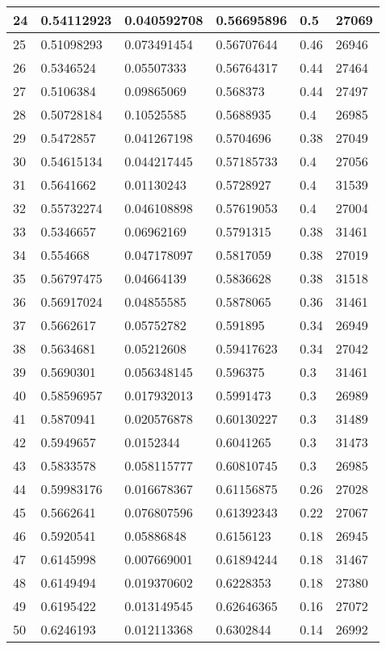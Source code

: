 \begin{longtable}{|l|l|l|l|l|l|}
24 & 0.54112923 & 0.040592708 & 0.56695896 & 0.5 & 27069 \\ \hline 
25 & 0.51098293 & 0.073491454 & 0.56707644 & 0.46 & 26946 \\ \hline 
26 & 0.5346524 & 0.05507333 & 0.56764317 & 0.44 & 27464 \\ \hline 
27 & 0.5106384 & 0.09865069 & 0.568373 & 0.44 & 27497 \\ \hline 
28 & 0.50728184 & 0.10525585 & 0.5688935 & 0.4 & 26985 \\ \hline 
29 & 0.5472857 & 0.041267198 & 0.5704696 & 0.38 & 27049 \\ \hline 
30 & 0.54615134 & 0.044217445 & 0.57185733 & 0.4 & 27056 \\ \hline 
31 & 0.5641662 & 0.01130243 & 0.5728927 & 0.4 & 31539 \\ \hline 
32 & 0.55732274 & 0.046108898 & 0.57619053 & 0.4 & 27004 \\ \hline 
33 & 0.5346657 & 0.06962169 & 0.5791315 & 0.38 & 31461 \\ \hline 
34 & 0.554668 & 0.047178097 & 0.5817059 & 0.38 & 27019 \\ \hline 
35 & 0.56797475 & 0.04664139 & 0.5836628 & 0.38 & 31518 \\ \hline 
36 & 0.56917024 & 0.04855585 & 0.5878065 & 0.36 & 31461 \\ \hline 
37 & 0.5662617 & 0.05752782 & 0.591895 & 0.34 & 26949 \\ \hline 
38 & 0.5634681 & 0.05212608 & 0.59417623 & 0.34 & 27042 \\ \hline 
39 & 0.5690301 & 0.056348145 & 0.596375 & 0.3 & 31461 \\ \hline 
40 & 0.58596957 & 0.017932013 & 0.5991473 & 0.3 & 26989 \\ \hline 
41 & 0.5870941 & 0.020576878 & 0.60130227 & 0.3 & 31489 \\ \hline 
42 & 0.5949657 & 0.0152344 & 0.6041265 & 0.3 & 31473 \\ \hline 
43 & 0.5833578 & 0.058115777 & 0.60810745 & 0.3 & 26985 \\ \hline 
44 & 0.59983176 & 0.016678367 & 0.61156875 & 0.26 & 27028 \\ \hline 
45 & 0.5662641 & 0.076807596 & 0.61392343 & 0.22 & 27067 \\ \hline 
46 & 0.5920541 & 0.05886848 & 0.6156123 & 0.18 & 26945 \\ \hline 
47 & 0.6145998 & 0.007669001 & 0.61894244 & 0.18 & 31467 \\ \hline 
48 & 0.6149494 & 0.019370602 & 0.6228353 & 0.18 & 27380 \\ \hline 
49 & 0.6195422 & 0.013149545 & 0.62646365 & 0.16 & 27072 \\ \hline 
50 & 0.6246193 & 0.012113368 & 0.6302844 & 0.14 & 26992 \\ \hline 
\end{longtable}